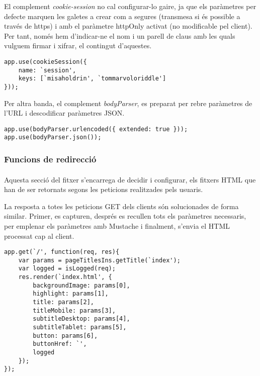     El complement \emph{cookie-session} no cal configurar-lo gaire, ja que els paràmetres per defecte marquen les galetes a crear com a segures (transmesa si és possible a través de https) i amb el paràmetre httpOnly activat (no modificable pel client). Per tant, només hem d'indicar-ne el nom i un parell de claus amb les quals vulguem firmar i xifrar, el contingut d'aquestes.

    \begin{lstlisting}[style=rawOwn,caption={Configuració del complement \emph{cookie-session}}]
app.use(cookieSession({
    name: `session',
    keys: [`misaholdrin', `tommarvoloriddle']
}));
    \end{lstlisting}

    Per altra banda, el complement \emph{bodyParser}, es preparat per rebre paràmetres de l'URL i descodificar paràmetres JSON.

    \begin{lstlisting}[style=rawOwn,caption={Configuració del complement \emph{bodyParser}}]
app.use(bodyParser.urlencoded({ extended: true }));
app.use(bodyParser.json());
    \end{lstlisting}


    \subsubsection{Funcions de redirecció}

    \paragraph{}
    Aquesta secció del fitxer s'encarrega de decidir i configurar, els fitxers HTML que han de ser retornats segons les peticions realitzades pels usuaris.

    La resposta a totes les peticions GET dels clients són solucionades de forma similar. Primer, es capturen, després es recullen tots els paràmetres necessaris, per emplenar els paràmetres amb Mustache i finalment, s'envia el HTML processat cap al client.

    \begin{lstlisting}[style=rawOwn,caption={Respota del servidor davant la petició del recurs `/'}]
app.get(`/', function(req, res){
    var params = pageTitlesIns.getTitle(`index');
    var logged = isLogged(req);
    res.render(`index.html', {
        backgroundImage: params[0],
        highlight: params[1],
        title: params[2],
        titleMobile: params[3],
        subtitleDesktop: params[4],
        subtitleTablet: params[5],
        button: params[6],
        buttonHref: `',
        logged
    });
});
    \end{lstlisting}

